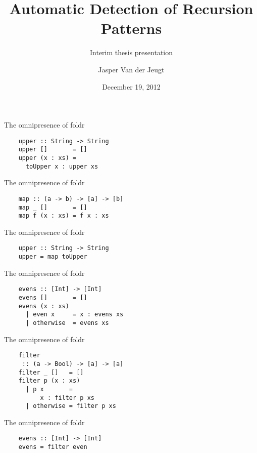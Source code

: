 \documentclass[20pt]{beamer}
\begin{document}
\title{Automatic Detection of Recursion Patterns}
\subtitle{Interim thesis presentation}
\author{Jasper Van der Jeugt}
\date{December 19, 2012}

\begin{frame}[plain]
    \titlepage
\end{frame}


\begin{frame}[fragile]{The omnipresence of foldr}
    \begin{lstlisting}
    upper :: String -> String
    upper []       = []
    upper (x : xs) =
      toUpper x : upper xs
    \end{lstlisting}
\end{frame}

\begin{frame}[fragile]{The omnipresence of foldr}
    \begin{lstlisting}
    map :: (a -> b) -> [a] -> [b]
    map _ []       = []
    map f (x : xs) = f x : xs
    \end{lstlisting}
\end{frame}

\begin{frame}[fragile]{The omnipresence of foldr}
    \begin{lstlisting}
    upper :: String -> String
    upper = map toUpper
    \end{lstlisting}
\end{frame}

\begin{frame}[fragile]{The omnipresence of foldr}
    \begin{lstlisting}
    evens :: [Int] -> [Int]
    evens []       = []
    evens (x : xs)
      | even x     = x : evens xs
      | otherwise  = evens xs
    \end{lstlisting}
\end{frame}

\begin{frame}[fragile]{The omnipresence of foldr}
    \begin{lstlisting}
    filter
     :: (a -> Bool) -> [a] -> [a]
    filter _ []   = []
    filter p (x : xs)
      | p x       =
          x : filter p xs
      | otherwise = filter p xs
    \end{lstlisting}
\end{frame}

\begin{frame}[fragile]{The omnipresence of foldr}
    \begin{lstlisting}
    evens :: [Int] -> [Int]
    evens = filter even
    \end{lstlisting}
\end{frame}
\end{document}
